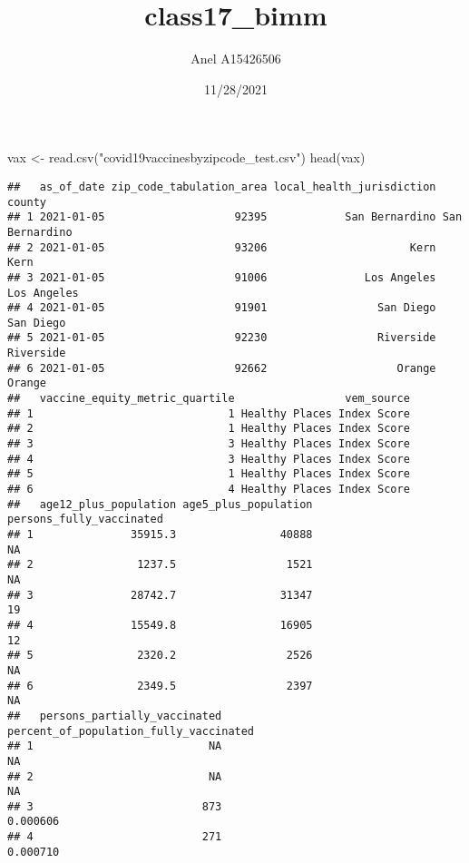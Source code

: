 \documentclass[
]{article}
\title{class17\_bimm}
\author{Anel A15426506}
\date{11/28/2021}
\newenvironment{Shaded}{\begin{snugshade}}{\end{snugshade}}
\newcommand{\FunctionTok}[1]{\textcolor[rgb]{0.00,0.00,0.00}{#1}}
\newcommand{\NormalTok}[1]{#1}
\newcommand{\OtherTok}[1]{\textcolor[rgb]{0.56,0.35,0.01}{#1}}
\newcommand{\StringTok}[1]{\textcolor[rgb]{0.31,0.60,0.02}{#1}}
\begin{document}
\maketitle

\begin{Shaded}
\begin{Highlighting}[]
\NormalTok{vax }\OtherTok{\textless{}{-}} \FunctionTok{read.csv}\NormalTok{(}\StringTok{"covid19vaccinesbyzipcode\_test.csv"}\NormalTok{)}
\FunctionTok{head}\NormalTok{(vax)}
\end{Highlighting}
\end{Shaded}

\begin{verbatim}
##   as_of_date zip_code_tabulation_area local_health_jurisdiction         county
## 1 2021-01-05                    92395            San Bernardino San Bernardino
## 2 2021-01-05                    93206                      Kern           Kern
## 3 2021-01-05                    91006               Los Angeles    Los Angeles
## 4 2021-01-05                    91901                 San Diego      San Diego
## 5 2021-01-05                    92230                 Riverside      Riverside
## 6 2021-01-05                    92662                    Orange         Orange
##   vaccine_equity_metric_quartile                 vem_source
## 1                              1 Healthy Places Index Score
## 2                              1 Healthy Places Index Score
## 3                              3 Healthy Places Index Score
## 4                              3 Healthy Places Index Score
## 5                              1 Healthy Places Index Score
## 6                              4 Healthy Places Index Score
##   age12_plus_population age5_plus_population persons_fully_vaccinated
## 1               35915.3                40888                       NA
## 2                1237.5                 1521                       NA
## 3               28742.7                31347                       19
## 4               15549.8                16905                       12
## 5                2320.2                 2526                       NA
## 6                2349.5                 2397                       NA
##   persons_partially_vaccinated percent_of_population_fully_vaccinated
## 1                           NA                                     NA
## 2                           NA                                     NA
## 3                          873                               0.000606
## 4                          271                               0.000710

\end{verbatim}
\end{document}
